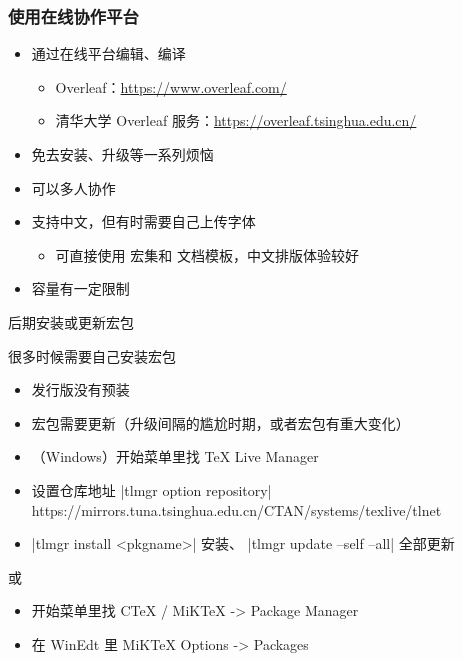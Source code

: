 \begin{frame}[fragile]
  \frametitle{使用在线协作平台}
  \begin{itemize}
    \item 通过在线平台编辑、编译
      \begin{itemize}
        \item Overleaf：\url{https://www.overleaf.com/}
        \item 清华大学 Overleaf 服务：\url{https://overleaf.tsinghua.edu.cn/}
      \end{itemize}
    \item 免去安装、升级等一系列烦恼
    \item 可以多人协作
    \item 支持中文，但有时需要自己上传字体
      \begin{itemize}
        \item 可直接使用  宏集和  文档模板，中文排版体验较好
      \end{itemize}
    \item 容量有一定限制
  \end{itemize}
\end{frame}


\begin{frame}[fragile]{后期安装或更新宏包}
  \begin{exampleblock}{很多时候需要自己安装宏包}
    \begin{itemize}
      \item 发行版没有预装
      \item 宏包需要更新（\TL 升级间隔的尴尬时期，或者宏包有重大变化）
    \end{itemize}
  \end{exampleblock}
  \begin{exampleblock}{\TL}
    \begin{itemize}
      \item （Windows）开始菜单里找 TeX Live Manager
      \item 设置仓库地址 |tlmgr option repository| {\footnotesize\ttfamily
        https://mirrors.tuna.tsinghua.edu.cn/CTAN/systems/texlive/tlnet}
      \item |tlmgr install <pkgname>| 安装、 |tlmgr update --self --all| 全部更新
    \end{itemize}
  \end{exampleblock}
  \begin{exampleblock}{\CTeX 或 \MiKTeX}
    \begin{itemize}
      \item 开始菜单里找 CTeX / MiKTeX -> Package Manager
      \item 在 WinEdt 里 MiKTeX Options -> Packages
    \end{itemize}
  \end{exampleblock}
\end{frame}

